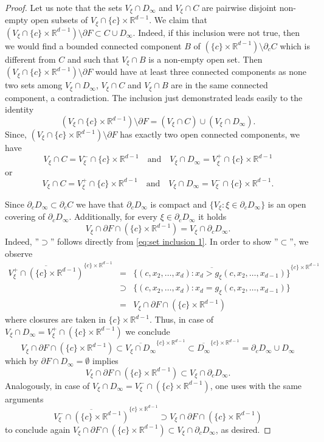\documentclass[10pt,a4paper]{amsart}
\newcommand{\R}{\mathbb R}
\begin{document}
\begin{proof}
Let us note that the sets $V_\xi\cap D_\infty$ and $V_\xi\cap C$ are pairwise disjoint non-empty open subsets of $V_\xi\cap\{c\}\times\R^{d-1}$. 
We claim that $(V_\xi\cap\{c\}\times\R^{d-1})\setminus\partial F\subset C\cup D_\infty$. Indeed, if this inclusion were not true, then we would find a bounded connected component $B$ of $\left(\{c\}\times\R^{d-1}\right)\setminus \partial_c C$ which is different from $C$ and such that 
$V_\xi\cap B$ is a non-empty open set. Then $(V_\xi\cap\{c\}\times\R^{d-1})\setminus\partial F$ would have at least three connected components as none two sets among $V_\xi\cap D_\infty$, $V_\xi\cap C$ and $V_\xi\cap B$ are in the same connected component, a contradiction. The inclusion just demonstrated leads easily to the identity  
$$(V_\xi\cap\{c\}\times\R^{d-1})\setminus\partial F=(V_\xi\cap C)\cup (V_\xi\cap D_\infty).$$
Since, $(V_\xi\cap\{c\}\times\R^{d-1})\setminus\partial F$ has exactly two open connected components, we have
$$V_\xi\cap C=V_\xi^-\cap\{c\}\times\R^{d-1}\quad\text{and}\quad V_\xi\cap D_\infty=V_\xi^+\cap\{c\}\times\R^{d-1}$$ 
or 
$$V_\xi\cap C=V_\xi^+\cap\{c\}\times\R^{d-1}\quad\text{and}\quad V_\xi\cap D_\infty=V_\xi^-\cap\{c\}\times\R^{d-1}.$$ 

Since $\partial_c D_\infty\subset \partial_c C$ we have that $\partial_c D_\infty$ is compact and $\{V_\xi:\xi\in\partial_c D_\infty\}$ is an open covering of $\partial_c D_\infty$. Additionally, for every $\xi\in \partial_c D_\infty$ it holds
	$$V_\xi\cap\partial F\cap\left(\{c\}\times\R^{d-1}\right)=V_\xi\cap \partial_c D_\infty.$$
Indeed, ''$\supset$'' follows directly from \eqref{eq:set inclusion 1}. In order to show ''$\subset$'', we observe
\begin{eqnarray*}
	\overline{V_\xi^+\cap(\{c\}\times\R^{d-1})}^{\{c\}\times\R^{d-1}}&=&\overline{\{(c,x_2,\ldots,x_d): x_d> g_\xi(c,x_2,\ldots,x_{d-1})\}}^{\{c\}\times\R^{d-1}}\\
	&\supset& \{(c,x_2,\ldots,x_d): x_d= g_\xi(c,x_2,\ldots,x_{d-1})\}\\
	&=&V_\xi\cap \partial F\cap(\{c\}\times\R^{d-1})
\end{eqnarray*}
where closures are taken in $\{c\}\times\R^{d-1}$. Thus, in case of $V_\xi\cap D_\infty=V_\xi^+\cap(\{c\}\times\R^{d-1})$ we conclude
$$V_\xi\cap \partial F\cap(\{c\}\times\R^{d-1})\subset \overline{V_\xi\cap D_\infty}^{\{c\}\times\R^{d-1}}\subset \overline{D_\infty}^{\{c\}\times\R^{d-1}}=\partial_c D_\infty\cup D_\infty$$
which by $\partial F\cap D_\infty=\emptyset$ implies
$$V_\xi\cap\partial F\cap(\{c\}\times\R^{d-1})\subset V_\xi\cap \partial_c D_\infty.$$
Analogously, in case of $V_\xi\cap D_\infty=V_\xi^-\cap(\{c\}\times\R^{d-1})$, one uses with the same arguments
$$\overline{V_\xi^-\cap(\{c\}\times\R^{d-1})}^{\{c\}\times\R^{d-1}}\supset V_\xi\cap \partial F\cap(\{c\}\times\R^{d-1})$$
to conclude again $V_\xi\cap\partial F\cap(\{c\}\times\R^{d-1})\subset V_\xi\cap \partial_c D_\infty$, as desired.


\end{proof}
\end{document}
